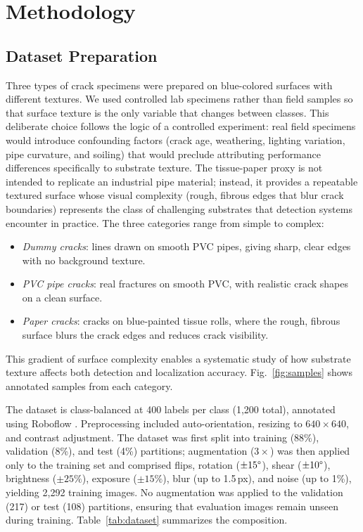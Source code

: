 \documentclass[conference]{IEEEtran}
\begin{document}
\section{Methodology}

\subsection{Dataset Preparation}

Three types of crack specimens were prepared on blue-colored surfaces with different textures. We used controlled lab specimens rather than field samples so that surface texture is the only variable that changes between classes. This deliberate choice follows the logic of a controlled experiment: real field specimens would introduce confounding factors (crack age, weathering, lighting variation, pipe curvature, and soiling) that would preclude attributing performance differences specifically to substrate texture. The tissue-paper proxy is not intended to replicate an industrial pipe material; instead, it provides a repeatable textured surface whose visual complexity (rough, fibrous edges that blur crack boundaries) represents the class of challenging substrates that detection systems encounter in practice. The three categories range from simple to complex:
\begin{itemize}
    \item \textit{Dummy cracks}: lines drawn on smooth PVC pipes, giving sharp, clear edges with no background texture.
    \item \textit{PVC pipe cracks}: real fractures on smooth PVC, with realistic crack shapes on a clean surface.
    \item \textit{Paper cracks}: cracks on blue-painted tissue rolls, where the rough, fibrous surface blurs the crack edges and reduces crack visibility.
\end{itemize}
This gradient of surface complexity enables a systematic study of how substrate texture affects both detection and localization accuracy. Fig.~\ref{fig:samples} shows annotated samples from each category.

The dataset is class-balanced at 400 labels per class (1,200 total), annotated using Roboflow \cite{roboflow2023}. Preprocessing included auto-orientation, resizing to $640 \times 640$, and contrast adjustment. The dataset was first split into training (88\%), validation (8\%), and test (4\%) partitions; augmentation ($3\times$) was then applied only to the training set and comprised flips, rotation ($\pm15\degree$), shear ($\pm10\degree$), brightness ($\pm25\%$), exposure ($\pm15\%$), blur (up to 1.5\,px), and noise (up to 1\%), yielding 2,292 training images. No augmentation was applied to the validation (217) or test (108) partitions, ensuring that evaluation images remain unseen during training. Table~\ref{tab:dataset} summarizes the composition.
\end{document}
